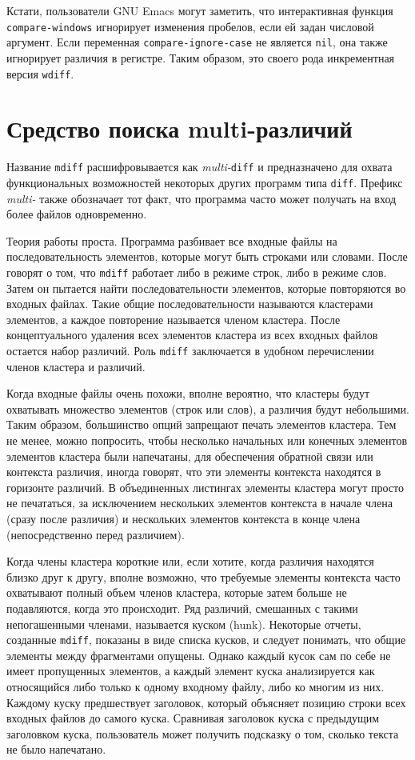 Кстати, пользователи GNU Emacs могут заметить, что интерактивная функция
\texttt{compare-windows} игнорирует изменения пробелов, если ей задан
числовой аргумент. Если переменная \texttt{compare-ignore-case} не
является \texttt{nil}, она также игнорирует различия в регистре. Таким
образом, это своего рода инкрементная версия \texttt{wdiff}.

\hypertarget{mdiff}{%
\section{Средство поиска multi-различий}\label{mdiff}}

Название \texttt{mdiff} расшифровывается как \emph{multi-}\texttt{diff}
и предназначено для охвата функциональных возможностей некоторых других
программ типа \texttt{diff}. Префикс \emph{multi-} также обозначает тот
факт, что программа часто может получать на вход более файлов
одновременно.

Теория работы проста. Программа разбивает все входные файлы на
последовательность элементов, которые могут быть строками или словами.
После говорят о том, что \texttt{mdiff} работает либо в режиме строк,
либо в режиме слов. Затем он пытается найти последовательности
элементов, которые повторяются во входных файлах. Такие общие
последовательности называются кластерами элементов, а каждое повторение
называется членом кластера. После концептуального удаления всех
элементов кластера из всех входных файлов остается набор различий. Роль
\texttt{mdiff} заключается в удобном перечислении членов кластера и
различий.

Когда входные файлы очень похожи, вполне вероятно, что кластеры будут
охватывать множество элементов (строк или слов), а различия будут
небольшими. Таким образом, большинство опций запрещают печать элементов
кластера. Тем не менее, можно попросить, чтобы несколько начальных или
конечных элементов элементов кластера были напечатаны, для обеспечения
обратной связи или контекста различия, иногда говорят, что эти элементы
контекста находятся в горизонте различий. В объединенных листингах
элементы кластера могут просто не печататься, за исключением нескольких
элементов контекста в начале члена (сразу после различия) и нескольких
элементов контекста в конце члена (непосредственно перед различием).

Когда члены кластера короткие или, если хотите, когда различия находятся
близко друг к другу, вполне возможно, что требуемые элементы контекста
часто охватывают полный объем членов кластера, которые затем больше не
подавляются, когда это происходит. Ряд различий, смешанных с такими
непогашенными членами, называется куском (hunk). Некоторые отчеты,
созданные \texttt{mdiff}, показаны в виде списка кусков, и следует
понимать, что общие элементы между фрагментами опущены. Однако каждый
кусок сам по себе не имеет пропущенных элементов, а каждый элемент куска
анализируется как относящийся либо только к одному входному файлу, либо
ко многим из них. Каждому куску предшествует заголовок, который
объясняет позицию строки всех входных файлов до самого куска. Сравнивая
заголовок куска с предыдущим заголовком куска, пользователь может
получить подсказку о том, сколько текста не было напечатано.

